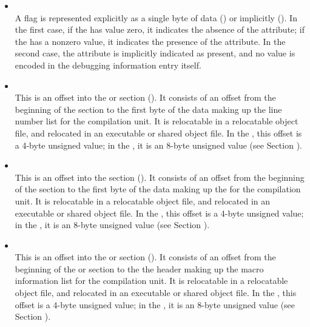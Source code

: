 \begin{itemize}
\item {} \\
A flag 
is represented explicitly as a single byte of data
(\DWFORMflagTARG) or 
implicitly (\DWFORMflagpresentTARG). 
In the
first case, if the  has value zero, it indicates the
absence of the attribute; if the  has a non\dash zero value,
it indicates the presence of the attribute. In the second
case, the attribute is implicitly indicated as present, and
no value is encoded in the debugging information entry itself.

\item {} \\
This is an offset into 
the 
\dotdebugline{} or \dotdebuglinedwo{} section
(\DWFORMsecoffset).
It consists of an offset from the beginning of the 
\dotdebugline{}
section to the first byte of
the data making up the line number list for the compilation
unit. 
It is relocatable in a relocatable object file, and
relocated in an executable or shared object file. In the 
\thirtytwobitdwarfformat, this offset is a 4-byte unsigned value;
in the \sixtyfourbitdwarfformat, it is an 8-byte unsigned value
(see Section ).


\item {} \\
This is an offset into the 
\dotdebugloc{}
section
(\DWFORMsecoffset). 
It consists of an offset from the
beginning of the 
\dotdebugloc{}
section to the first byte of
the data making up the 
 for the compilation unit. 
It is relocatable in a relocatable object file, and
relocated in an executable or shared object file. In the 
\thirtytwobitdwarfformat, this offset is a 4-byte unsigned value;
in the \sixtyfourbitdwarfformat, it is an 8-byte unsigned value
(see Section ).


\item {} \\
This is an 
offset into the 
\dotdebugmacro{} or \dotdebugmacrodwo{} section
(\DWFORMsecoffset). 
It consists of an offset from the beginning of the 
\dotdebugmacro{} or \dotdebugmacrodwo{} 
section to the the header making up the 
macro information list for the compilation unit. 
It is relocatable in a relocatable object file, and
relocated in an executable or shared object file. In the 
\thirtytwobitdwarfformat, this offset is a 4-byte unsigned value;
in the \sixtyfourbitdwarfformat, it is an 8-byte unsigned value
(see Section ).


\end{itemize}

